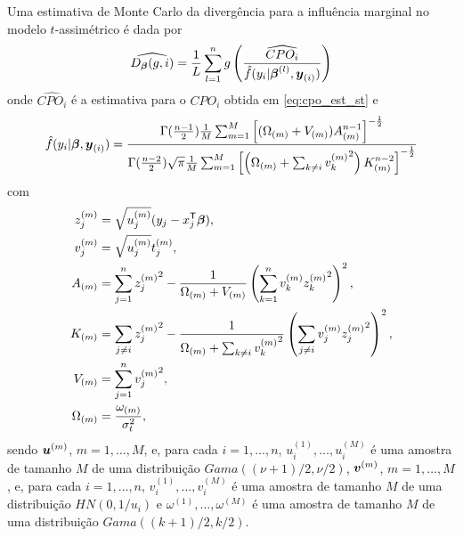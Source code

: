 \begin{prop}

Uma estimativa de Monte Carlo da divergência para a influência marginal no modelo $t$-assimétrico é dada por
\begin{equation}
\widehat{D_{\boldsymbol{\beta}}(g,i)} = \frac{1}{L}\sum_{l=1}^n g\left(\frac{\widehat{CPO_i}}{\hat{f}(y_i|{\boldsymbol{\beta}}^{(l)},{\boldsymbol{y}_{(i)}})}\right)
\end{equation}
onde $\widehat{CPO_i}$ é a estimativa para o $CPO_i$ obtida em \eqref{eq:cpo_est_st} e 
\begin{equation}
\begin{split}
\hat{f}(y_i|{\boldsymbol{\beta}},{\boldsymbol{y}_{(i)}}) =
\frac{\Gamma(\frac{n-1}{2})\frac{1}{M}\sum_{m=1}^M\left[(\Omega_{(m)}+V_{(m)}) A_{(m)}^{n-1}\right]^{-\frac{1}{2}}}
{\Gamma(\frac{n-2}{2})\sqrt{\pi}\frac{1}{M}\sum_{m=1}^M \left[ \left(\Omega_{(m)} + \sum_{k \neq i}{v_k^{(m)}}^2\right) K_{(m)}^{n-2}\right]^{-\frac{1}{2}}}
\end{split}
\end{equation}
com
\begin{equation}
\begin{split}
z_j^{(m)} & = \sqrt{u^{(m)}_j}(y_j-x_j^{\mathsf{T}}{\boldsymbol{\beta}}) ,\\
v_j^{(m)} & = \sqrt{u^{(m)}_j}t_j^{(m)} ,\\
A_{(m)} & = \sum_{j=1}^n{z_j^{(m)}}^2 - \frac{1}{\Omega_{(m)} + V_{(m)}}\left(\sum_{k=1}^nv_k^{(m)}{z_k^{(m)}}^2\right)^2 ,\\
K_{(m)} & = \sum_{j\neq i}{z_j^{(m)}}^2-\frac{1}{\Omega_{(m)}+\sum_{k \neq i}{v_k^{(m)}}^2}\left(\sum_{j\neq i}v_j^{(m)}{z_j^{(m)}}^2\right)^2 ,\\
V_{(m)} & = \sum_{j=1}^n {v_j^{(m)}}^2 ,\\
\Omega_{(m)} & = \frac{\omega_{(m)}}{\sigma^2_t},
\end{split}
\end{equation}
sendo ${\boldsymbol{u}}^{(m)}$, $m=1,\ldots,M$, e, para cada $i=1,\ldots,n$, $u_i^{(1)},\ldots,u_i^{(M)}$ é uma amostra de tamanho $M$ de uma distribuição $Gama((\nu+1)/2,\nu/2)$, ${\boldsymbol{v}}^{(m)}$, $m=1,\ldots,M$, e, para cada $i=1,\ldots,n$, $v_i^{(1)},\ldots,v_i^{(M)}$ é uma amostra de tamanho $M$ de uma distribuição $HN(0,1/u_i)$ e $\omega^{(1)},\ldots,\omega^{(M)}$ é uma amostra de tamanho $M$ de uma distribuição $Gama((k+1)/2,k/2)$.
\end{prop}

